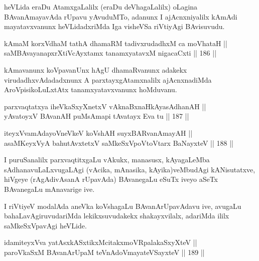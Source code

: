 \begin{artha}
heVLida eraDu AtamxgaLalilx (eraDu deVhagaLalilx) oLagina\break	
BAvanAmayavAda rUpavu yAvuduMTo, adanunx I ajAcnxniyalilx kAmAdi
mayatavxvanunx heVLidadxriMda Iga visheVSa riVtiyAgi BAvisuvudu.
\end{artha}


\begin{shl}
kAmaM korxVdhaM tathA dhamaRM tadivxrudadhxM ca moVhataH ||  \\
saMBAvayanapxrXtiVcAyxtamx tanamxyatavxM nigacaCxti \hfill || 186 || 
\end{shl}

\begin{artha}
kAmavanunx koVpavanUnx hAgU dhamaRvanunx adakekx virudadhxvAdadadxnunx
A parxtayxgAtamxnalilx ajAcnxnadiMda AroVpisikoLuLxtAtx\break
tanamxyatavxvanunx hoMduvanu.
\end{artha}


\begin{shl}
parxvaqtatxya iheVkaSxyXnetxV vAknaBxnaHkAyasAdhanAH || \\
yAvatoyxV BAvanAH puMsAmapi tAvatayx Eva tu \hfill || 187 ||  
\end{shl}

\begin{shl}
iteyxVvamAdayoV\s neVkeV koVshAH suyxBARvanAmayAH || \\
asaMKeyxVyA bahutAvxtetxV saMkeSxVpoV\s toV\s tarx BaNayxteV \hfill || 188 ||  
\end{shl}

\begin{artha}
I puruSanalilx parxvaqtitxgaLu vAkukx, manasusx, kAyagaLeMba
sAdhanavuLaLxvugaLAgi (vAcika, mAnasika, kAyika)veMbudAgi
kANisutatxve, hiVgeye (rAgAdivAsanA rUpavAda) BAvanegaLu eSuTx iveyo
aSeTx BAvanegaLu mAnavarige ive.
\end{artha}

\begin{artha}
I riVtiyeV modalAda aneVka koVshagaLu BAvanArUpavAdavu ive, avugaLu
bahaLavAgiruvudariMda lekikxsuvudakekx shakayxvilalx, adariMda ililx
saMkeSxVpavAgi heVLide.
\end{artha}


\begin{shl}
idamiteyxVva yatAsxkASxtikxMcitakxmoVRpalakaSxyXteV || \\
paroVkaSxM BAvanArUpaM teVnAdoVmayateVSayxteV \hfill || 189 ||  
\end{shl}

